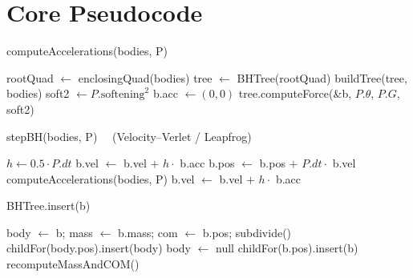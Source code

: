 \documentclass[11pt]{article}
\begin{document}

\bigskip

\section*{Core Pseudocode}

\begin{algorithm}[H]
\caption{computeAccelerations(bodies, P)}
\begin{algorithmic}[1]
\State rootQuad $\gets$ enclosingQuad(bodies)
\State tree $\gets$ BHTree(rootQuad)
\State buildTree(tree, bodies)
\State soft2 $\gets P.\text{softening}^2$
  \State b.acc $\gets (0,0)$
  \State tree.computeForce(\&b, $P.\theta$, $P.G$, soft2)
\EndFor
\end{algorithmic}
\end{algorithm}

\begin{algorithm}[H]
\caption{stepBH(bodies, P) \ \ (Velocity--Verlet / Leapfrog)}
\begin{algorithmic}[1]
\State $h \gets 0.5 \cdot P.dt$
 
  \State b.vel $\gets$ b.vel $+$ $h \cdot$ b.acc
\EndFor
{} 
  \State b.pos $\gets$ b.pos $+$ $P.dt \cdot$ b.vel
\EndFor
\State computeAccelerations(bodies, P) 
 
  \State b.vel $\gets$ b.vel $+$ $h \cdot$ b.acc
\EndFor
\end{algorithmic}
\end{algorithm}

\begin{algorithm}[H]
\caption{BHTree.insert(b)}
\begin{algorithmic}[1]
 \State \Return \EndIf
{}
  \State body $\gets$ b; mass $\gets$ b.mass; com $\gets$ b.pos; \Return
\EndIf
{} 
  \State subdivide()
    \State childFor(body.pos).insert(body)
    \State body $\gets$ null
  \EndIf
\EndIf
\State childFor(b.pos).insert(b)
\State recomputeMassAndCOM()
\end{algorithmic}
\end{algorithm}
\end{document}
